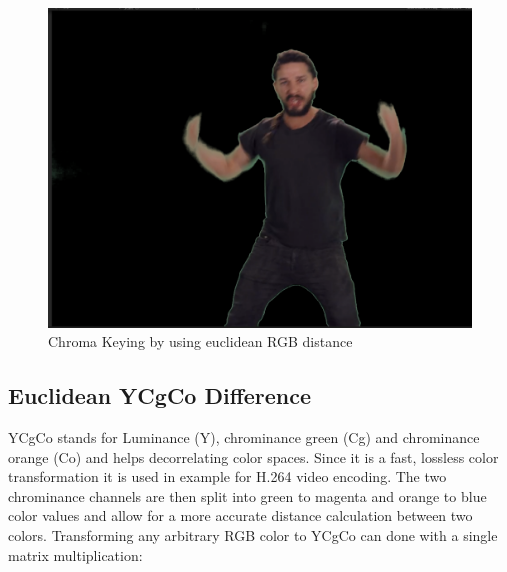 \begin{figure}[htb]
	\includegraphics[width=\textwidth]{_raw_resources/Comparison_RGB_color.png}
	\caption{Chroma Keying by using euclidean RGB distance}
	\label{fig:chroma:euclidean:rgb}
\end{figure}

\subsection{Euclidean YCgCo Difference}

YCgCo stands for Luminance (Y), chrominance green (Cg) and chrominance orange 
(Co) and helps decorrelating color spaces. Since it is a fast, lossless color 
transformation it is used in example for H.264 video encoding. The two 
chrominance channels are then split into green to magenta and orange to blue 
color values and allow for a more accurate distance calculation between two 
colors.
\newline
Transforming any arbitrary RGB color to YCgCo can done with a single matrix 
multiplication:



